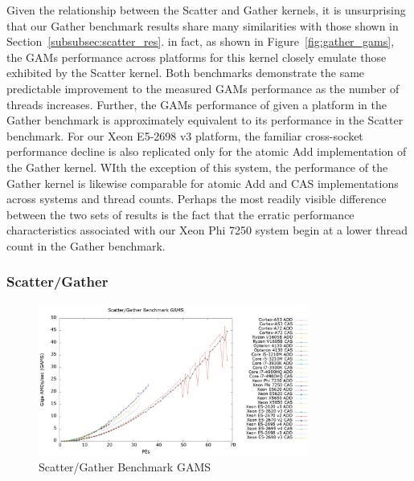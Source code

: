 Given the relationship between the Scatter and Gather kernels, it is unsurprising that our Gather benchmark results share many similarities with those shown in Section~\ref{subsubsec:scatter_res}.
in fact, as shown in Figure~\ref{fig:gather_gams}, the GAMs performance across platforms for this kernel closely emulate those exhibited by the Scatter kernel.
Both benchmarks demonstrate the same predictable improvement to the measured GAMs performance as the number of threads increases.
Further, the GAMs performance of given a platform in the Gather benchmark is approximately equivalent to its performance in the Scatter benchmark.
For our Xeon E5-2698 v3 platform, the familiar cross-socket performance decline is also replicated only for the atomic Add implementation of the Gather kernel.
WIth the exception of this system, the performance of the Gather kernel is likewise comparable for atomic Add and CAS implementations across systems and thread counts. 
Perhaps the most readily visible difference between the two sets of results is the fact that the erratic performance characteristics associated with our Xeon Phi 7250 system begin at a lower thread count in the Gather benchmark.

\subsubsection{Scatter/Gather}
\label{subsubsec:sg_res}

\begin{figure}[!t]
\centering
\includegraphics[width=3.5in]{figures/SG_GAMS.png}
\caption{Scatter/Gather Benchmark GAMS}
\label{fig:sg_gams}
\end{figure}

